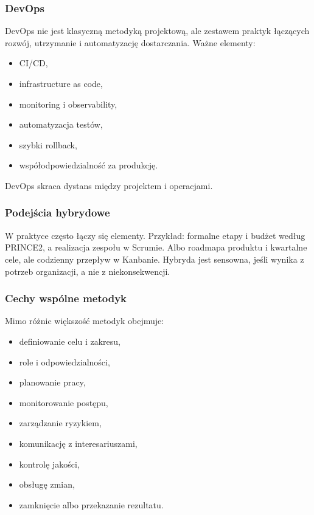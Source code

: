 \subsubsection{DevOps}

DevOps nie jest klasyczną metodyką projektową, ale zestawem praktyk łączących rozwój, utrzymanie i automatyzację dostarczania. Ważne elementy:
\begin{itemize}
  \item CI/CD,
  \item infrastructure as code,
  \item monitoring i observability,
  \item automatyzacja testów,
  \item szybki rollback,
  \item współodpowiedzialność za produkcję.
\end{itemize}

DevOps skraca dystans między projektem i operacjami.

\subsubsection{Podejścia hybrydowe}

W praktyce często łączy się elementy. Przykład: formalne etapy i budżet według PRINCE2, a realizacja zespołu w Scrumie. Albo roadmapa produktu i kwartalne cele, ale codzienny przepływ w Kanbanie. Hybryda jest sensowna, jeśli wynika z potrzeb organizacji, a nie z niekonsekwencji.

\subsubsection{Cechy wspólne metodyk}

Mimo różnic większość metodyk obejmuje:
\begin{itemize}
  \item definiowanie celu i zakresu,
  \item role i odpowiedzialności,
  \item planowanie pracy,
  \item monitorowanie postępu,
  \item zarządzanie ryzykiem,
  \item komunikację z interesariuszami,
  \item kontrolę jakości,
  \item obsługę zmian,
  \item zamknięcie albo przekazanie rezultatu.
\end{itemize}

